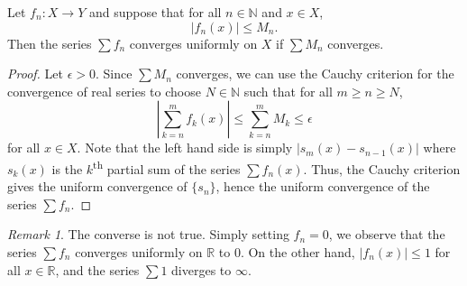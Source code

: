 \documentclass[11pt]{article}
\def\R{\mathbb{R}}
\def\N{\mathbb{N}}
\theoremstyle{definition}
\theoremstyle{remark}
\newtheorem*{remark}{Remark}
\numberwithin{equation}{module}
\begin{document}
    \begin{theorem}
        Let $f_n\colon X \to Y$ and suppose that for all $n \in \N$ and $x \in X$,
        \[
            |f_n(x)| \leq M_n.
        \]
        Then the series $\sum f_n$ converges uniformly on $X$ if $\sum M_n$
        converges.
    \end{theorem}
    \begin{proof}
        Let $\epsilon > 0$. Since $\sum M_n$ converges, we can use the Cauchy
        criterion for the convergence of real series to choose $N \in \N$ such that
        for all $m \geq n \geq N$, \[
            \left|\sum_{k = n}^m f_k(x)\right| \leq \sum_{k = n}^m M_k \leq \epsilon
        \] for all $x \in X$.
        Note that the left hand side is simply $|s_m(x) - s_{n - 1}(x)|$ where
        $s_k(x)$ is the $k$\textsuperscript{th} partial sum of the series $\sum
        f_n(x)$. Thus, the Cauchy criterion gives the uniform convergence of 
        $\{s_n\}$, hence the uniform convergence of the series $\sum f_n$.
    \end{proof}
    \begin{remark}
        The converse is not true. Simply setting $f_n = 0$, we observe that the
        series $\sum f_n$ converges uniformly on $\R$ to $0$. On the other hand,
        $|f_n(x)| \leq 1$ for all $x \in \R$, and the series $\sum 1$ diverges to
        $\infty$.
    \end{remark}
\end{document}
